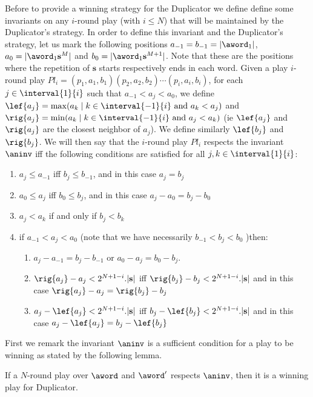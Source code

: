 Before to provide a winning strategy for the Duplicator we define define some invariants on any $i$-round play (with $i \leq N$) that will be maintained by the Duplicator's strategy. In order to define this invariant and the Duplicator's strategy, let us mark the following positions $a_{-1}=b_{-1}=|\aword_1|$,
$a_{0}=|\aword_1\mathbf{s}^{M}|$ and $b_{0}=|\aword_1\mathbf{s}^{M+1}|$. Note that these are the positions where the repetition of $\mathbf{s}$ starts
respectively ends in each word.
 Given a play $i$-round play $Pl_i=(p_1,a_1,b_1)(p_2,a_2,b_2)\cdots(p_i,a_i,b_i)$, for each $j \in \interval{1}{i}$ such that $a_{-1} < a_j < a_{0}$, we define $\lef{a_j}=\max(a_k \mid k \in \interval{-1}{i} \mbox{ and } a_k < a_j)$ and $\rig{a_j}=\min(a_k \mid k \in \interval{-1}{i} \mbox{ and } a_j < a_k)$ (ie $\lef{a_j}$ and $\rig{a_j}$ are the closest neighbor of $a_j$). We define similarly $\lef{b_j}$ and $\rig{b_j}$. We will then say that the $i$-round play $Pl_i$ respects the invariant $\aninv$ iff the following conditions are satisfied for all $j,k \in \interval{1}{i}$:
\begin{enumerate}
  \item $a_{j} \leq a_{-1}$ iff  $b_{j} \leq b_{-1}$, and in this case  $a_{j}=b_{j}$ 
  \item $a_0 \leq a_j$ iff $b_0 \leq b_j$, and in this case $a_{j}-a_0=b_{j}-b_0$
  \item $a_{j}<a_{k}$ if and only if $b_{j}<b_{k}$
  \item if $a_{-1} < a_j < a_{0}$ (note that we have necessarily $b_{-1} < b_j < b_{0}$ )then:
    \begin{enumerate}
      \item  $a_{j}-a_{-1}=b_{j}-b_{-1}$ or $a_{0}-a_{j}=b_{0}-b_{j}$.
      \item $\rig{a_j}-a_j < 2^{N+1-i}.|\mathbf{s}|$ iff $\rig{b_{j}}-b_j< 
        2^{N+1-i}.|\mathbf{s}|$  and in this case $\rig{a_j}-a_{j} = \rig{b_j}-b_j$
      \item $ a_j-\lef{a_j} < 2^{N+1-i}.|\mathbf{s}|$ iff $b_j - \lef{b_{j}} <
        2^{N+1-i}.|\mathbf{s}|$  and in this case $a_j-\lef{a_{j}} = b_j-\lef{b_{j}}$ 


    \end{enumerate}
\end{enumerate}
First we remark the invariant $\aninv$ is a sufficient condition for a play to be winning as stated by the following lemma.
\begin{lemma}
\label{lem-inv}
If a $N$-round play over $\aword$ and $\aword'$ respects $\aninv$, then it is a winning play for Duplicator.
\end{lemma}
